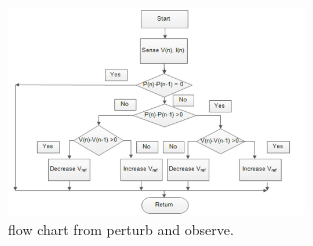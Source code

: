 \begin{figure}[htbp]
	\begin{center}
		\includegraphics[width=0.7\textwidth]{../Pictures/P1/Flow_chart/flow_chart_perturb_observe}
		\caption{flow chart from perturb and observe\cite{PerturbObserveFC}.}
		\label{fcperturbandobserve}
	\end{center}	
\end{figure}


